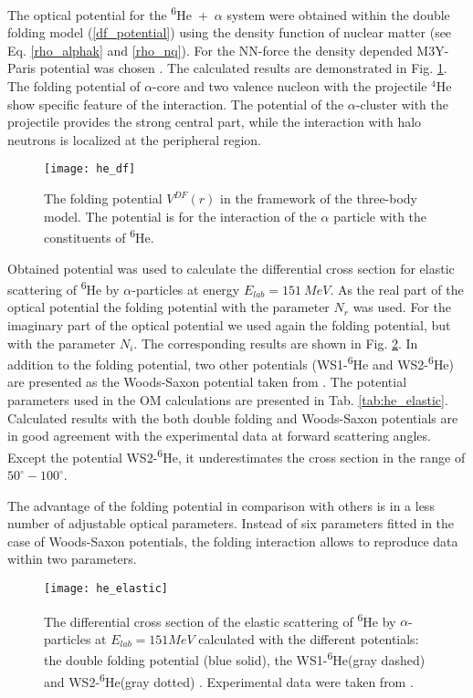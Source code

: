 \documentclass[
12pt, %
oneside, %
english, %
onehalfspacing, %
onehalfspacing, %
headsepline, %
]{MastersDoctoralThesis} %
\newcommand{\he}{\textsuperscript{6}He\xspace}
\begin{document}
The optical potential for the \he~+~$\alpha$ system were obtained within the double folding model (\ref{df_potential}) using  the density function of nuclear matter (see Eq. \ref{rho_alphak} and \ref{rho_nq}). For the NN-force the density depended M3Y-Paris potential was chosen \cite{anantaraman1983effective}.
The calculated results are demonstrated in Fig. \ref{he_df}. The folding potential of $\alpha$-core and two valence nucleon with the projectile $^4$He show specific feature of the interaction.
The potential of the $\alpha$-cluster with the projectile provides the strong central part, while the interaction with halo neutrons is localized at the peripheral region.

\begin{figure}[h!]
\centering
\texttt{[image: he\_df]}
\decoRule
\caption{  \footnotesize  The folding potential $V^{DF}(r)$ in the framework of the three-body model. The potential is for the interaction of the $\alpha$ particle with the constituents of \he.
}
\label{he_df}
\end{figure}

Obtained potential was used to calculate the differential cross section for elastic scattering of \he by $\alpha$-particles at energy $ E_{lab} = 151~MeV$. As the real part of the optical potential the folding potential with the parameter $N_r$ was used. For the imaginary part of the optical potential we used again the folding potential, but with the parameter $N_i$.
The corresponding results are shown in Fig. \ref{he_elastic}. 
In addition to the folding potential, two other potentials (WS1-\he and WS2-\he) are presented as the Woods-Saxon potential taken from \cite{oganessian1999dynamics}.
 The potential parameters used in the OM calculations are presented in Tab. \ref{tab:he_elastic}.
Calculated results with the both double folding and Woods-Saxon potentials are in good agreement with the experimental data at forward scattering angles.
Except the potential WS2-\he, it underestimates the cross section in the range of $50^\circ-100^\circ$.

The advantage of the folding potential in comparison with others is in a less number of adjustable optical parameters. Instead of six parameters fitted in the case of Woods-Saxon potentials, the folding interaction allows to reproduce data within two parameters.

\begin{figure}
\centering
\texttt{[image: he\_elastic]}
\decoRule
\caption{  \footnotesize  The differential cross section of the elastic scattering of \he by $\alpha$-particles at $E_{lab}=151MeV$ calculated with the different potentials: the double folding potential (blue solid), the WS1-\he  (gray dashed) \cite{oganessian1999dynamics} and  WS2-\he (gray dotted) \cite{oganessian1999dynamics}. Experimental data were taken from \cite{oganessian1999dynamics}.
}
\label{he_elastic}
\end{figure}
\end{document}
